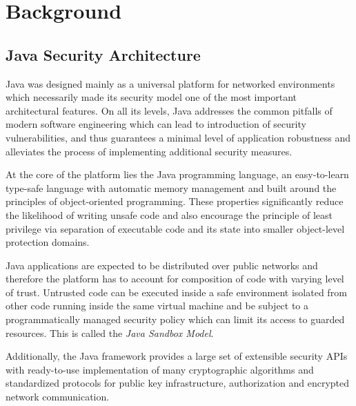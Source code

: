 \documentclass[a4paper,12pt,twoside,openright]{report}
\begin{document}
\chapter{Background} 

% 

\section{Java Security Architecture}

Java was designed mainly as a universal platform for networked environments which necessarily made its security model one of the most important architectural features. On all its levels, Java addresses the common pitfalls of modern software engineering which can lead to introduction of security vulnerabilities, and thus guarantees a minimal level of application robustness and alleviates the process of implementing additional security measures.

At the core of the platform lies the Java programming language, an easy-to-learn type-safe language with automatic memory management and built around the principles of object-oriented programming. These properties significantly reduce the likelihood of writing unsafe code and also encourage the principle of least privilege via separation of executable code and its state into smaller object-level protection domains.

Java applications are expected to be distributed over public networks and therefore the platform has to account for composition of code with varying level of trust. Untrusted code can be executed inside a safe environment isolated from other code running inside the same virtual machine and be subject to a programmatically managed security policy which can limit its access to guarded resources. This is called the \emph{Java Sandbox Model}.

Additionally, the Java framework provides a large set of extensible security APIs with ready-to-use implementation of many cryptographic algorithms and standardized protocols for public key infrastructure, authorization and encrypted network communication. 
\end{document}

